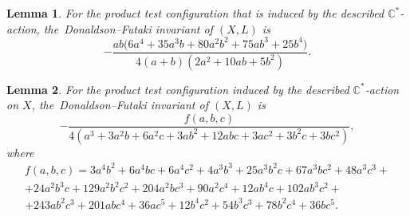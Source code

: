 \documentclass[10pt,a4paper]{amsart}
\newtheorem{lemma}{Lemma}
\newcommand{\C}{\mathbb{C}}
\begin{document}
\begin{lemma}
\label{lemma:2-26-DF}
For the product test configuration that is induced by the described $\C^*$-action, the~Donaldson--Futaki invariant of $(X,L)$ is
\begin{equation}
\label{equation:2-26-DF}
-\frac{ab\bigl(6a^4+35a^3b+80a^2b^2+75ab^3+25b^4\bigr)}{4(a+b)(2a^2+10ab+5b^2)}.
\end{equation}
\end{lemma}

\begin{lemma}
\label{lemma:3-16-DF}
For the product test configuration induced by the described $\C^*$-action on $X$, the~Donaldson--Futaki invariant of $(X,L)$ is
$$
-\frac{f(a,b,c)}{4(a^{3} + 3 a^{2} b + 6 a^{2} c + 3 a b^{2} + 12 a b c + 3 a c^{2} + 3 b^{2} c + 3 b c^{2})},
$$
where
\begin{multline*}
f(a,b,c)=3a^{4} b^{2} + 6 a^{4} b c + 6 a^{4} c^{2} + 4 a^{3} b^{3} + 25 a^{3} b^{2} c + 67 a^{3} b c^{2} + 48 a^{3} c^{3}+\\
+ 24 a^{2} b^{3} c + 129 a^{2} b^{2} c^{2} + 204 a^{2} b c^{3} + 90 a^{2} c^{4}+ 12 a b^{4} c + 102 a b^{3} c^{2} + \\
+243 a b^{2} c^{3} + 201 a b c^{4} + 36 a c^{5}+ 12 b^{4} c^{2} + 54 b^{3} c^{3} + 78 b^{2} c^{4} + 36 b c^{5}.
\end{multline*}
\end{lemma}
\end{document}
